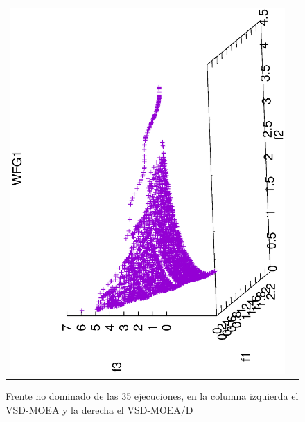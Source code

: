\begin{figure}[H]
\centering
\scriptsize
\caption{Frente no dominado de las 35 ejecuciones, en la columna izquierda el VSD-MOEA y la derecha el VSD-MOEA/D}%
\begin{tabular}{cc}
  \includegraphics[scale=0.3, angle=-90,origin=c]{Figures_Chapter7/Results_Chapter4/Summary_Representative/VSD-MOEA/WFG1.eps}  &

\end{tabular}
\end{figure}
